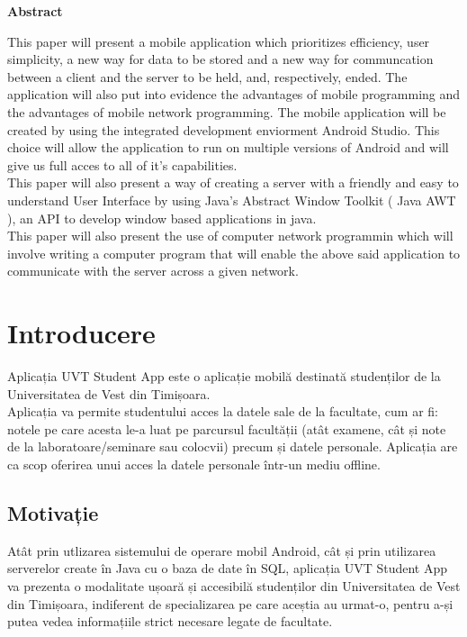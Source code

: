 \documentclass{article}
\begin{document}
	\Large
	\textbf{Abstract}
	\vspace{1.5cm}
	\normalsize

		This paper will present a mobile application which prioritizes efficiency, user simplicity, a new way for data to be stored and a new way for communcation between a client and the server to be held, and, respectively, ended. The application will also put into evidence the advantages of mobile programming and the advantages of mobile network programming. The mobile application will be created by using the integrated development enviorment Android Studio. This choice will allow the application to run on multiple versions of Android and will give us full acces to all of it's capabilities.\\
		This paper will also present a way of creating a server with a friendly and easy to understand User Interface by using Java's Abstract Window Toolkit ( Java AWT ), an API to develop window based applications in java. \\
		This paper will also present the use of computer network programmin which will involve writing a computer program that will enable the above said application to communicate with the server across a given network.

		
	\newpage

	\tableofcontents

 	\newpage 

	\section{Introducere}
	\vspace{1cm}
		
		Aplicația UVT Student App este o aplicație mobilă destinată studenților de la Universitatea de Vest din Timișoara.\\ 
		Aplicația va permite studentului acces la datele sale de la facultate, cum ar fi: notele pe care acesta le-a luat pe parcursul facultății (atât examene, cât și note de la laboratoare/seminare sau colocvii) precum și datele personale. Aplicația are ca scop oferirea unui acces la datele personale într-un mediu offline. \\
		
		\subsection{Motivație}
		\vspace{0.3cm}
		Atât prin utlizarea sistemului de operare mobil Android, cât și prin utilizarea serverelor create în Java cu o baza de date în SQL, aplicația UVT Student App va prezenta o modalitate ușoară și accesibilă studenților din Universitatea de Vest din Timișoara, indiferent de specializarea pe care aceștia au urmat-o, pentru a-și putea vedea informațiile strict necesare legate de facultate. \\
\end{document}
